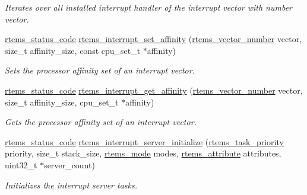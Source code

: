 \begin{DoxyCompactItemize}
\begin{DoxyCompactList}\small\item\em Iterates over all installed interrupt handler of the interrupt vector with number {\itshape vector}. \end{DoxyCompactList}\item 
\mbox{\hyperlink{group__ClassicStatus_ga545d41846817eaba6143d52ee4d9e9fe}{rtems\+\_\+status\+\_\+code}} \mbox{\hyperlink{group__rtems__interrupt__extension_ga29b0adc04eff6ae74fd02076a7f2eee6}{rtems\+\_\+interrupt\+\_\+set\+\_\+affinity}} (\mbox{\hyperlink{group__ClassicINTR_ga3e434c197d99f128e78cae4d9358bd8b}{rtems\+\_\+vector\+\_\+number}} vector, size\+\_\+t affinity\+\_\+size, const cpu\+\_\+set\+\_\+t $\ast$affinity)
\begin{DoxyCompactList}\small\item\em Sets the processor affinity set of an interrupt vector. \end{DoxyCompactList}\item 
\mbox{\hyperlink{group__ClassicStatus_ga545d41846817eaba6143d52ee4d9e9fe}{rtems\+\_\+status\+\_\+code}} \mbox{\hyperlink{group__rtems__interrupt__extension_gaf99a316611a290b2e58d9caf48594838}{rtems\+\_\+interrupt\+\_\+get\+\_\+affinity}} (\mbox{\hyperlink{group__ClassicINTR_ga3e434c197d99f128e78cae4d9358bd8b}{rtems\+\_\+vector\+\_\+number}} vector, size\+\_\+t affinity\+\_\+size, cpu\+\_\+set\+\_\+t $\ast$affinity)
\begin{DoxyCompactList}\small\item\em Gets the processor affinity set of an interrupt vector. \end{DoxyCompactList}\item 
\mbox{\hyperlink{group__ClassicStatus_ga545d41846817eaba6143d52ee4d9e9fe}{rtems\+\_\+status\+\_\+code}} \mbox{\hyperlink{group__rtems__interrupt__extension_ga7e728143679eb46d7c4792ea401a4335}{rtems\+\_\+interrupt\+\_\+server\+\_\+initialize}} (\mbox{\hyperlink{group__ClassicTasks_gaa80a0c0938307d1e99d0eb5fee765b47}{rtems\+\_\+task\+\_\+priority}} priority, size\+\_\+t stack\+\_\+size, \mbox{\hyperlink{group__ClassicModes_ga8d46a41a837840dc97336fdcd20e4f68}{rtems\+\_\+mode}} modes, \mbox{\hyperlink{group__ClassicAttributes_gaea40313cf78ed843e09c4315d0a10f79}{rtems\+\_\+attribute}} attributes, uint32\+\_\+t $\ast$server\+\_\+count)
\begin{DoxyCompactList}\small\item\em Initializes the interrupt server tasks. \end{DoxyCompactList}\item 

\end{DoxyCompactItemize}
